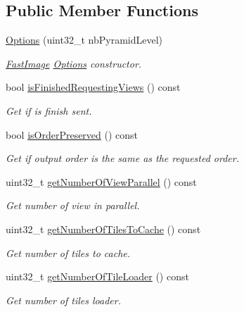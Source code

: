 \subsection*{Public Member Functions}
\begin{DoxyCompactItemize}
\item 
\hyperlink{classfi_1_1FastImage_1_1Options_a4a46b54745677fc1b88cffc2f8e53e2c}{Options} (uint32\+\_\+t nb\+Pyramid\+Level)
\begin{DoxyCompactList}\small\item\em \hyperlink{classfi_1_1FastImage}{Fast\+Image} \hyperlink{classfi_1_1FastImage_1_1Options}{Options} constructor. \end{DoxyCompactList}\item 
bool \hyperlink{classfi_1_1FastImage_1_1Options_a3cfa4c38cdb0b2018c812bbcb8e9dd63}{is\+Finished\+Requesting\+Views} () const
\begin{DoxyCompactList}\small\item\em Get if is finish sent. \end{DoxyCompactList}\item 
bool \hyperlink{classfi_1_1FastImage_1_1Options_a088e2f97d9c9297fd6151c030820bd62}{is\+Order\+Preserved} () const
\begin{DoxyCompactList}\small\item\em Get if output order is the same as the requested order. \end{DoxyCompactList}\item 
uint32\+\_\+t \hyperlink{classfi_1_1FastImage_1_1Options_af9e404f908cbfa016bb1774748948512}{get\+Number\+Of\+View\+Parallel} () const
\begin{DoxyCompactList}\small\item\em Get number of view in parallel. \end{DoxyCompactList}\item 
uint32\+\_\+t \hyperlink{classfi_1_1FastImage_1_1Options_a39db813117479230ea638119ac587bab}{get\+Number\+Of\+Tiles\+To\+Cache} () const
\begin{DoxyCompactList}\small\item\em Get number of tiles to cache. \end{DoxyCompactList}\item 
uint32\+\_\+t \hyperlink{classfi_1_1FastImage_1_1Options_a409187a3f6f176cd9e551c3aaed2d944}{get\+Number\+Of\+Tile\+Loader} () const
\begin{DoxyCompactList}\small\item\em Get number of tiles loader. \end{DoxyCompactList}\item 

\end{DoxyCompactItemize}
